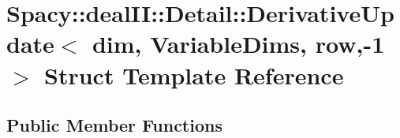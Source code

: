 \hypertarget{structSpacy_1_1dealII_1_1Detail_1_1DerivativeUpdate_3_01dim_00_01VariableDims_00_01row_00-1_01_4}{\section{\-Spacy\-:\-:deal\-I\-I\-:\-:\-Detail\-:\-:\-Derivative\-Update$<$ dim, \-Variable\-Dims, row,-\/1 $>$ \-Struct \-Template \-Reference}
\label{structSpacy_1_1dealII_1_1Detail_1_1DerivativeUpdate_3_01dim_00_01VariableDims_00_01row_00-1_01_4}
}
\subsection*{\-Public \-Member \-Functions}
